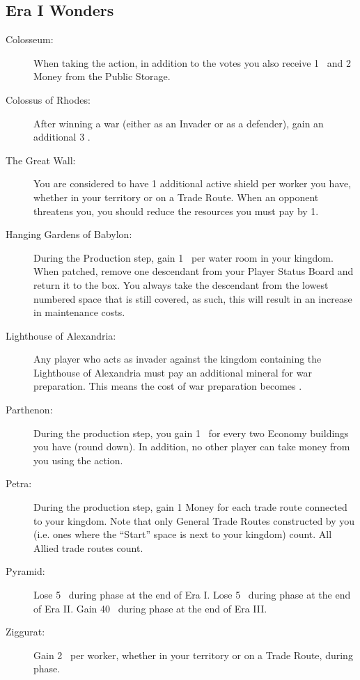 \documentclass[10pt,twocolumn]{article}
\begin{document}
\begin{appendices}
\subsection{Era I Wonders}
\begin{description}
\item[Colosseum:] When taking the  action, in addition to the votes you also receive 1 \vp\ and 2 Money from the Public Storage.
\item[Colossus of Rhodes:] After winning a war (either as an Invader or as a defender), gain an additional 3 \vps.
\item[The Great Wall:] You are considered to have 1 additional active shield per worker you have, whether in your territory or on a Trade Route. When an opponent threatens you, you should reduce the resources you must pay by 1.
\item[Hanging Gardens of Babylon:] During the Production step, gain 1 \vp\ per water room in your kingdom. When patched, remove one descendant from your Player Status Board and return it to the box. You always take the descendant from the lowest numbered space that is still covered, as such, this will result in an increase in maintenance costs.
\item[Lighthouse of Alexandria:] Any player who acts as invader against the kingdom containing the Lighthouse of Alexandria must pay an additional mineral for war preparation. This means the cost of war preparation becomes .
\item[Parthenon:] During the production step, you gain 1 \vp\ for every two Economy buildings you have (round down). In addition, no other player can take money from you using the  action.
\item[Petra:] During the production step, gain 1 Money for each trade route connected to your kingdom. Note that only General Trade Routes constructed by you (i.e. ones where the ``Start'' space is next to your kingdom) count. All Allied trade routes count.
\item[Pyramid:] Lose 5 \vps\ during  phase at the end of Era I. Lose 5 \vps\ during  phase at the end of Era II. Gain 40 \vps\ during  phase at the end of Era III.
\item[Ziggurat:] Gain 2 \vps\ per worker, whether in your territory or on a Trade Route, during  phase.
\end{description}

\end{appendices}
\end{document}
